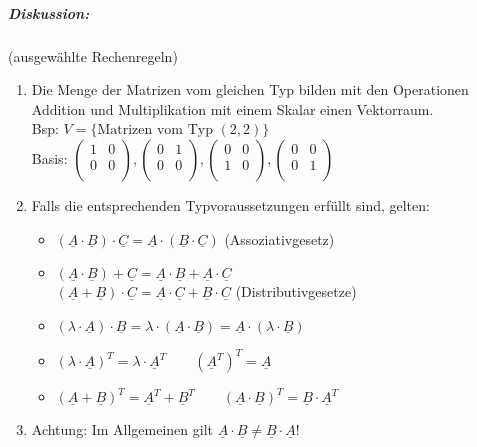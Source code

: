 \subparagraph{Diskussion:} (ausgewählte Rechenregeln)
\begin{enumerate}
\item Die Menge der Matrizen vom gleichen Typ bilden mit den Operationen Addition und Multiplikation mit einem Skalar einen Vektorraum.\\
Bsp:  $V=\{\text{Matrizen vom Typ }(2,2)\}$\\
Basis: $\begin{pmatrix}
1& 0\\
0 &0 \\
\end{pmatrix},\begin{pmatrix}
0& 1\\
0 &0 \\
\end{pmatrix},\begin{pmatrix}
0& 0\\
1 &0 \\
\end{pmatrix},\begin{pmatrix}
0& 0\\
0 &1 \\
\end{pmatrix}$
\item Falls die entsprechenden Typvoraussetzungen erfüllt sind, gelten: 
\begin{itemize}
\item $(\underline{A}\cdot \underline{B})\cdot \underline{C}=\underline{A}\cdot (\underline{B}\cdot \underline{C})$ (Assoziativgesetz)
\item $(\underline{A}\cdot \underline{B})+ \underline{C}=\underline{A}\cdot \underline{B}+ \underline{A}\cdot \underline{C}$\\
$(\underline{A}+ \underline{B})\cdot \underline{C}=\underline{A}\cdot \underline{C}+ \underline{B}\cdot \underline{C}$ (Distributivgesetze)
\item $(\lambda \cdot \underline{A})\cdot \underline{B}=\lambda \cdot (\underline{A}\cdot \underline{B})=\underline{A}\cdot (\lambda\cdot \underline{B})$
\item $(\lambda \cdot \underline{A})^T=\lambda \cdot \underline{A}^T \qquad \left(\underline{A}^T\right)^T=\underline{A}$
\item $(\underline{A}+\underline{B})^T=\underline{A}^T+\underline{B}^T
 \qquad \boxed{\left(\underline{A}\cdot \underline{B}\right)^T=\underline{B}\cdot \underline{A}^T}$
\end{itemize}
\item Achtung: Im Allgemeinen gilt $\underline{A} \cdot \underline{B} \not = \underline{B} \cdot \underline{A}$!

\end{enumerate}
